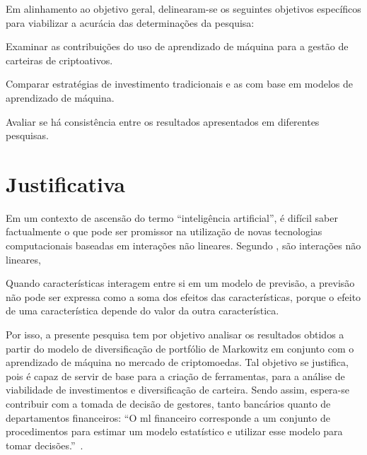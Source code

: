 \label{subsec_objetivos_especificos}

Em alinhamento ao objetivo geral, delinearam-se os seguintes objetivos específicos para viabilizar a acurácia das determinações da pesquisa:

\begin{alineas}

    \item  Examinar as contribuições do uso de aprendizado de máquina para a gestão de carteiras de criptoativos.

    \item Comparar estratégias de investimento tradicionais e as com base em modelos de aprendizado de máquina.

    \item Avaliar se há consistência entre os resultados apresentados em diferentes pesquisas.

\end{alineas}

\section{Justificativa}
\label{sec_justificativa}

Em um contexto de ascensão do termo ``inteligência artificial'', é difícil saber factualmente o que pode ser promissor na utilização de novas tecnologias computacionais baseadas em interações não lineares. Segundo , são interações não lineares,

\begin{citacao}
Quando características interagem entre si em um modelo de previsão, a previsão não pode ser expressa como a soma dos efeitos das características, porque o efeito de uma característica depende do valor da outra característica.
\end{citacao}

Por isso, a presente pesquisa tem por objetivo analisar os resultados obtidos a partir do modelo de diversificação de portfólio de Markowitz em conjunto com o aprendizado de máquina no mercado de criptomoedas. Tal objetivo se justifica, pois é capaz de servir de base para a criação de ferramentas, para a análise de viabilidade de investimentos e diversificação de carteira. Sendo assim, espera-se contribuir com a tomada de decisão de gestores, tanto bancários quanto de departamentos financeiros: ``O \acl{ml} financeiro corresponde a um conjunto de procedimentos para estimar um modelo estatístico e utilizar esse modelo para tomar decisões.''~\cite[p.~10, tradução nossa]{kelly2023financial}.

